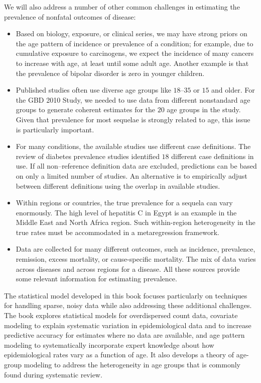 We will also address a number of other common challenges in estimating the
prevalence of nonfatal outcomes of disease:
\begin{itemize}
\item Based on biology, exposure, or clinical series, we may have strong
priors on the age pattern of incidence or prevalence of a condition;
for example, due to cumulative exposure to carcinogens, we expect the
incidence of many cancers to increase with
age, at least until some
adult age.  Another example is that the prevalence of bipolar
disorder is zero in younger children.

\item Published studies often use diverse age groups like $18$--$35$
or $15$ and older.  For the GBD 2010 Study, we needed to use data from different
nonstandard age groups to generate coherent estimates for the $20$
age groups in the study.  Given that prevalence for most sequelae is
strongly related to age, this issue is particularly important.

\item For many conditions, the available studies use
different case definitions.  The review of diabetes prevalence studies
identified $18$ different case definitions in use.  If all non--reference
definition data are excluded, predictions can be based on only a
limited number of studies.  An alternative is to empirically
adjust between different definitions using the overlap
in available studies.

\item Within regions or
countries, the true prevalence for a sequela can vary enormously. The
high level of hepatitis C in Egypt is an example in the Middle East
and North Africa region.  Such within-region heterogeneity in the true
rates must be accommodated in a metaregression framework.

\item Data are collected for many different outcomes,
such as incidence, prevalence, remission, excess mortality, or
cause-specific mortality.  The mix of data varies across diseases and
across regions for a disease.  All these sources provide some
relevant information for estimating prevalence.
\end{itemize}

The statistical model developed in this book focuses
particularly on techniques for handling sparse, noisy data while also
addressing these additional challenges.  The book explores statistical
models for overdispersed count data, covariate modeling to explain
systematic variation in epidemiological data and to increase predictive
accuracy for estimates where no data are available, and age pattern
modeling to systematically incorporate expert knowledge about how
epidemiological rates vary as a function of age.  It also develops a 
theory of age-group modeling to address the heterogeneity in
age groups that is commonly found during systematic review.

